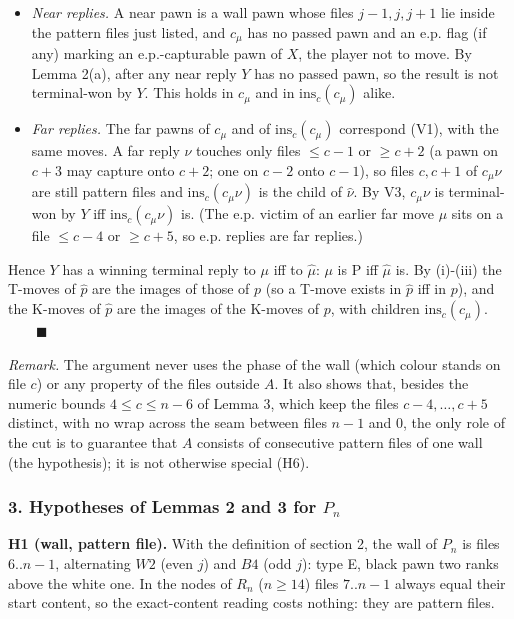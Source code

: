 \begin{itemize}
\item \emph{Near replies.} A near pawn is a wall pawn whose files $j-1,j,j+1$ lie inside the pattern files just listed, and $c_\mu$ has no passed pawn and an e.p. flag (if any) marking an e.p.-capturable pawn of $X$, the player not to move. By Lemma 2(a), after any near reply $Y$ has no passed pawn, so the result is not terminal-won by $Y$. This holds in $c_\mu$ and in $\mathrm{ins}_c(c_\mu)$ alike.
\item \emph{Far replies.} The far pawns of $c_\mu$ and of $\mathrm{ins}_c(c_\mu)$ correspond (V1), with the same moves. A far reply $\nu$ touches only files $\le c-1$ or $\ge c+2$ (a pawn on $c+3$ may capture onto $c+2$; one on $c-2$ onto $c-1$), so files $c,c+1$ of $c_\mu\nu$ are still pattern files and $\mathrm{ins}_c(c_\mu\nu)$ is the child of $\hat\nu$. By V3, $c_\mu\nu$ is terminal-won by $Y$ iff $\mathrm{ins}_c(c_\mu\nu)$ is. (The e.p. victim of an earlier far move $\mu$ sits on a file $\le c-4$ or $\ge c+5$, so e.p. replies are far replies.)
\end{itemize}
Hence $Y$ has a winning terminal reply to $\mu$ iff to $\hat\mu$: $\mu$ is P iff $\hat\mu$ is. By (i)-(iii) the T-moves of $\hat p$ are the images of those of $p$ (so a T-move exists in $\hat p$ iff in $p$), and the K-moves of $\hat p$ are the images of the K-moves of $p$, with children $\mathrm{ins}_c(c_\mu)$. $\qquad\blacksquare$

\emph{Remark.} The argument never uses the phase of the wall (which colour stands on file $c$) or any property of the files outside $A$. It also shows that, besides the numeric bounds $4\le c\le n-6$ of Lemma 3, which keep the files $c-4,\dots,c+5$ distinct, with no wrap across the seam between files $n-1$ and $0$, the only role of the cut is to guarantee that $A$ consists of consecutive pattern files of one wall (the hypothesis); it is not otherwise special (H6).

\subsubsection*{3. Hypotheses of Lemmas 2 and 3 for $P_n$}
\textbf{H1 (wall, pattern file).} With the definition of section 2, the wall of $P_n$ is files $6..n-1$, alternating $W2$ (even $j$) and $B4$ (odd $j$): type E, black pawn two ranks above the white one. In the nodes of $R_n$ ($n\ge14$) files $7..n-1$ always equal their start content, so the exact-content reading costs nothing: they are pattern files.

